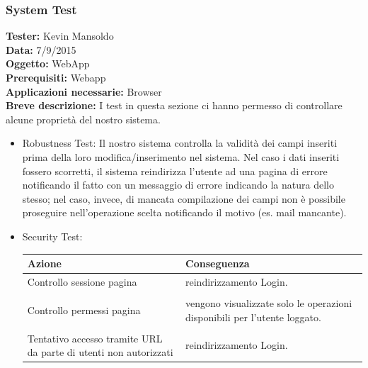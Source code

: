 \documentclass[a4paper,12pt]{article}
\begin{document}
\pagebreak

\subsubsection{System Test}
\textbf{Tester:} Kevin Mansoldo\\
\textbf{Data:} 7/9/2015\\
\textbf{Oggetto:} WebApp\\
\textbf{Prerequisiti:} Webapp\\
\textbf{Applicazioni necessarie:} Browser\\
\textbf{Breve descrizione:} I test in questa sezione ci hanno permesso di controllare alcune proprietà  del nostro sistema.\\

\begin{itemize}	

\item Robustness Test:
Il nostro sistema controlla la validità dei campi inseriti prima della loro modifica/inserimento nel sistema.
Nel caso i dati inseriti fossero scorretti, il sistema reindirizza l'utente ad una pagina di errore notificando il fatto con un messaggio di errore indicando la natura dello stesso; nel caso, invece, di mancata compilazione dei campi non è possibile proseguire nell'operazione scelta notificando il motivo (es. mail mancante).
\item Security Test:
\begin{table}[ht]
\begin{center}
\begin{tabular}{p{6.5cm} | p{6.5cm}}
\rowcolor{Ash}
\hline
Azione & Conseguenza \\ \hline
Controllo sessione pagina & reindirizzamento Login. \\
\vspace{0.2cm}\\
Controllo permessi pagina & vengono visualizzate solo le operazioni disponibili per l'utente loggato. \\
\vspace{0.2cm}\\
Tentativo accesso tramite URL da parte di utenti non autorizzati & reindirizzamento Login. \\ \hline
\end{tabular}
\end{center}
\end{table}

\end{itemize}
\end{document}
